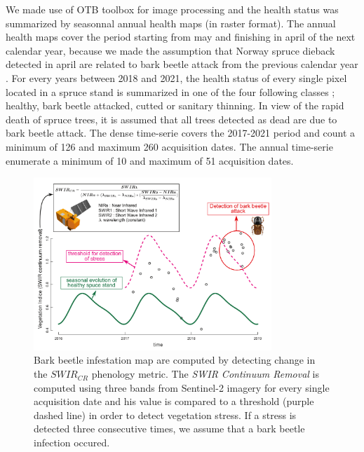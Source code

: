 \documentclass[3p,procedia]{elsarticle}
\begin{document}
We made use of OTB toolbox \citep{grizonnet_2017_OTB} for image processing and the health status was summarized by seasonnal annual health maps (in raster format).
The annual health maps cover the period starting from may and finishing in april of the next calendar year, because we made the assumption that Norway spruce dieback detected in april are related to bark beetle attack from the previous calendar year \citep{muller_features_2022}.
For every years between 2018 and 2021, the health status of every single pixel located in a spruce stand is summarized in one of the four following classes ; healthy, bark beetle attacked, cutted or sanitary thinning.
In view of the rapid death of spruce trees, it is assumed that all trees detected as dead are due to bark beetle attack.
The dense time-serie covers the 2017-2021 period and count a minimum of 126 and maximum 260 acquisition dates. 
The annual time-serie enumerate a minimum of 10 and maximum of 51 acquisition dates. 
 


\begin{figure}[htbp] 
	\centering
	\includegraphics[width=0.8\textwidth]{fctHarmo.png}
	\caption{Bark beetle infestation map are computed by detecting change in the $SWIR_{CR}$ phenology metric. The \textit{SWIR Continuum Removal} is computed using three bands from Sentinel-2 imagery for every single acquisition date and his value is compared to a threshold (purple dashed line) in order to detect vegetation stress. If a stress is detected three consecutive times, we assume that a bark beetle infection occured.}
	\label{fig:harmo}
\end{figure}
\end{document}
